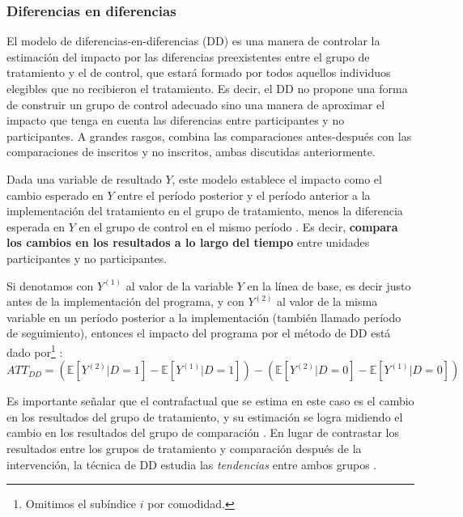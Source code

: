 \documentclass[../../main.tex]{subfiles}
\begin{document}
\subsubsection{Diferencias en diferencias}
El modelo de diferencias-en-diferencias (DD) es una manera de controlar la estimación del
impacto por las diferencias preexistentes entre el grupo de tratamiento y el de control,
que estará formado por todos aquellos individuos elegibles que no recibieron el
tratamiento. Es decir, el DD no propone una forma de construir un grupo de control
adecuado sino una manera de aproximar el impacto que tenga en cuenta las diferencias entre
participantes y no participantes. A grandes rasgos, combina las comparaciones
antes-después con las comparaciones de inscritos y no inscritos, ambas discutidas
anteriormente.

Dada una variable de resultado \(Y\), este modelo establece el impacto como el cambio
esperado en \(Y\) entre el período posterior y el período anterior a la implementación del
tratamiento en el grupo de tratamiento, menos la diferencia esperada en \(Y\) en el grupo
de control en el mismo período \cite{bernal}. Es decir, \textbf{compara los cambios en los
resultados a lo largo del tiempo} entre unidades participantes y no participantes.

Si denotamos con \(Y^{(1)}\) al valor de la variable \(Y\) en la línea de base, es decir
justo antes de la implementación del programa, y con \(Y^{(2)}\) al valor de la misma
variable en un período posterior a la implementación (también llamado período de
seguimiento), entonces el impacto del programa por el método de DD está dado
por\footnote{Omitimos el subíndice \(i\) por comodidad.} :
\begin{equation}
    ATT_{DD} =
        \left(
            \mathbb{E}\left[Y^{(2)}|D=1\right] - \mathbb{E}\left[Y^{(1)}|D=1\right]
        \right) -
        \left(
            \mathbb{E}\left[Y^{(2)}|D=0\right] - \mathbb{E}\left[Y^{(1)}|D=0\right]
        \right)
        \label{eq:dif-en-dif-1}
\end{equation}

Es importante señalar que el contrafactual que se estima en este caso es el cambio en los
resultados del grupo de tratamiento, y su estimación se logra midiendo el cambio en los
resultados del grupo de comparación \cite{gertler-2016}. En lugar de contrastar los
resultados entre los grupos de tratamiento y comparación después de la intervención, la
técnica de DD estudia las \textit{tendencias} entre ambos grupos \cite{gertler-2016}.
\end{document}
